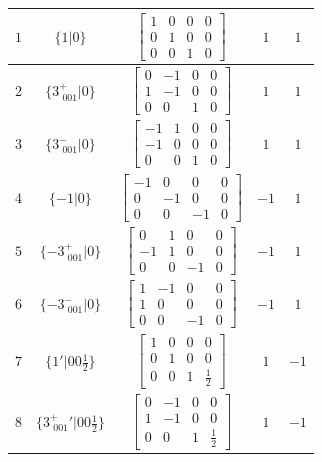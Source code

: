 \documentclass[fleqn,8pt]{jsarticle}
\begin{document}
\begin{longtable}{ccccc}
$ 1 $ & $ \{1|0\} $ & $ \begin{bmatrix} 1 & 0 & 0 & 0 \\ 0 & 1 & 0 & 0 \\ 0 & 0 & 1 & 0 \end{bmatrix} $ & $ 1 $ & $ 1 $ \\ \hline
$ 2 $ & $ \{3^{+}_{\,\,001}|0\} $ & $ \begin{bmatrix} 0 & -1 & 0 & 0 \\ 1 & -1 & 0 & 0 \\ 0 & 0 & 1 & 0 \end{bmatrix} $ & $ 1 $ & $ 1 $ \\ \hline
$ 3 $ & $ \{3^{-}_{\,\,001}|0\} $ & $ \begin{bmatrix} -1 & 1 & 0 & 0 \\ -1 & 0 & 0 & 0 \\ 0 & 0 & 1 & 0 \end{bmatrix} $ & $ 1 $ & $ 1 $ \\ \hline
$ 4 $ & $ \{-1|0\} $ & $ \begin{bmatrix} -1 & 0 & 0 & 0 \\ 0 & -1 & 0 & 0 \\ 0 & 0 & -1 & 0 \end{bmatrix} $ & $ -1 $ & $ 1 $ \\ \hline
$ 5 $ & $ \{-3^{+}_{\,\,001}|0\} $ & $ \begin{bmatrix} 0 & 1 & 0 & 0 \\ -1 & 1 & 0 & 0 \\ 0 & 0 & -1 & 0 \end{bmatrix} $ & $ -1 $ & $ 1 $ \\ \hline
$ 6 $ & $ \{-3^{-}_{\,\,001}|0\} $ & $ \begin{bmatrix} 1 & -1 & 0 & 0 \\ 1 & 0 & 0 & 0 \\ 0 & 0 & -1 & 0 \end{bmatrix} $ & $ -1 $ & $ 1 $ \\ \hline
$ 7 $ & $ \{1{}'|0 0 \frac{1}{2}\} $ & $ \begin{bmatrix} 1 & 0 & 0 & 0 \\ 0 & 1 & 0 & 0 \\ 0 & 0 & 1 & \frac{1}{2} \end{bmatrix} $ & $ 1 $ & $ -1 $ \\ \hline
$ 8 $ & $ \{3^{+}_{\,\,001}{}'|0 0 \frac{1}{2}\} $ & $ \begin{bmatrix} 0 & -1 & 0 & 0 \\ 1 & -1 & 0 & 0 \\ 0 & 0 & 1 & \frac{1}{2} \end{bmatrix} $ & $ 1 $ & $ -1 $ \\ \hline

\end{longtable}
\end{document}
